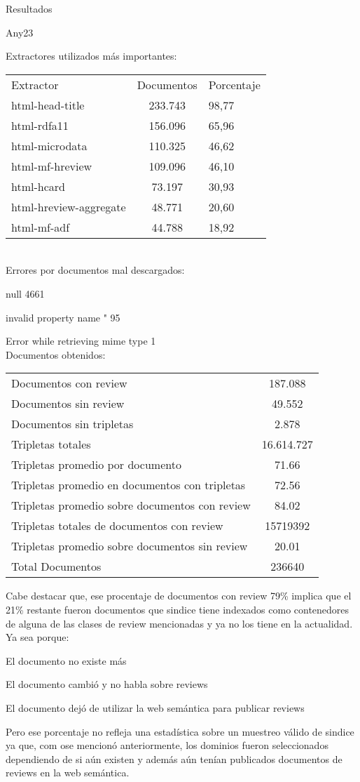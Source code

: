 Resultados

Any23

Extractores utilizados más importantes:
\begin{tabular}{| l | c | p | }
Extractor & Documentos & Porcentaje \\
html-head-title & 233.743 & 98,77 \\    
html-rdfa11 & 156.096 & 65,96 \\
html-microdata & 110.325 & 46,62\\    
html-mf-hreview & 109.096 & 46,10\\
html-hcard & 73.197 & 30,93  \\
html-hreview-aggregate & 48.771 & 20,60\\
html-mf-adf & 44.788 & 18,92\\
 \end{tabular}
 
\\

Errores por documentos mal descargados:

null 4661

invalid property name " 95

Error while retrieving mime type 1
\\ 
 
Documentos obtenidos:

\begin{tabular}{| l | c | }
Documentos con review & 187.088 \\
Documentos sin review & 49.552\\
Documentos sin tripletas & 2.878\\
Tripletas totales & 16.614.727\\
Tripletas promedio por documento & 71.66\\
Tripletas promedio en documentos con tripletas & 72.56\\
Tripletas promedio sobre documentos con review & 84.02\\
Tripletas totales de documentos con review & 15719392\\
Tripletas promedio sobre documentos sin review & 20.01\\
Total Documentos & 236640\\
\end{tabular}

Cabe destacar que, ese procentaje de documentos con review 79\% implica que el 21\% restante fueron documentos que sindice tiene indexados como contenedores de 
alguna de las clases de review mencionadas y ya no los tiene en la actualidad. Ya sea porque:

El documento no existe más

El documento cambió y no habla sobre reviews

El documento dejó de utilizar la web semántica para publicar reviews

Pero ese porcentaje no refleja una estadística sobre un muestreo válido de sindice ya que, com ose mencionó anteriormente, los dominios fueron seleccionados 
dependiendo de si aún existen y además aún tenían publicados documentos de reviews en la web semántica.